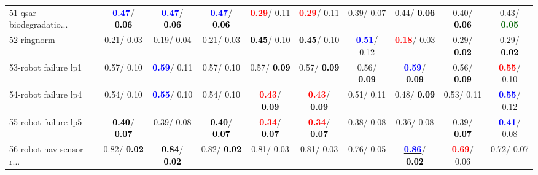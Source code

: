 \begin{table}[h]
\begin{center}
{\begin{tabular}{lc|c|c|c|c|c|c|c|c}
51-qsar biodegradatio... & \textcolor{blue}{\textbf{  0.47}}/\textcolor{black}{\textbf{  0.06}} & \textcolor{blue}{\textbf{  0.47}}/\textcolor{black}{\textbf{  0.06}} & \textcolor{blue}{\textbf{  0.47}}/\textcolor{black}{\textbf{  0.06}} & \textcolor{red}{\textbf{  0.29}}/  0.11 & \textcolor{red}{\textbf{  0.29}}/  0.11 &   0.39/  0.07 &   0.44/\textcolor{black}{\textbf{  0.06}} &   0.40/\textcolor{black}{\textbf{  0.06}} &   0.43/\textcolor{darkgreen}{\textbf{  0.05}} \\
52-ringnorm &   0.21/  0.03 &   0.19/  0.04 &   0.21/  0.03 & \textcolor{black}{\textbf{  0.45}}/  0.10 & \textcolor{black}{\textbf{  0.45}}/  0.10 & \underline{\textcolor{blue}{\textbf{  0.51}}}/  0.12 & \textcolor{red}{\textbf{  0.18}}/  0.03 &   0.29/\textcolor{black}{\textbf{  0.02}} &   0.29/\textcolor{black}{\textbf{  0.02}} \\
53-robot failure lp1 &   0.57/  0.10 & \textcolor{blue}{\textbf{  0.59}}/  0.11 &   0.57/  0.10 &   0.57/\textcolor{black}{\textbf{  0.09}} &   0.57/\textcolor{black}{\textbf{  0.09}} &   0.56/\textcolor{black}{\textbf{  0.09}} & \textcolor{blue}{\textbf{  0.59}}/\textcolor{black}{\textbf{  0.09}} &   0.56/\textcolor{black}{\textbf{  0.09}} & \textcolor{red}{\textbf{  0.55}}/  0.10 \\ \hline
54-robot failure lp4 &   0.54/  0.10 & \textcolor{blue}{\textbf{  0.55}}/  0.10 &   0.54/  0.10 & \textcolor{red}{\textbf{  0.43}}/\textcolor{black}{\textbf{  0.09}} & \textcolor{red}{\textbf{  0.43}}/\textcolor{black}{\textbf{  0.09}} &   0.51/  0.11 &   0.48/\textcolor{black}{\textbf{  0.09}} &   0.53/  0.11 & \textcolor{blue}{\textbf{  0.55}}/  0.12 \\
55-robot failure lp5 & \textcolor{black}{\textbf{  0.40}}/\textcolor{black}{\textbf{  0.07}} &   0.39/  0.08 & \textcolor{black}{\textbf{  0.40}}/\textcolor{black}{\textbf{  0.07}} & \textcolor{red}{\textbf{  0.34}}/\textcolor{black}{\textbf{  0.07}} & \textcolor{red}{\textbf{  0.34}}/\textcolor{black}{\textbf{  0.07}} &   0.38/  0.08 &   0.36/  0.08 &   0.39/\textcolor{black}{\textbf{  0.07}} & \underline{\textcolor{blue}{\textbf{  0.41}}}/  0.08 \\
56-robot nav sensor r... &   0.82/\textcolor{black}{\textbf{  0.02}} & \textcolor{black}{\textbf{  0.84}}/\textcolor{black}{\textbf{  0.02}} &   0.82/\textcolor{black}{\textbf{  0.02}} &   0.81/  0.03 &   0.81/  0.03 &   0.76/  0.05 & \underline{\textcolor{blue}{\textbf{  0.86}}}/\textcolor{black}{\textbf{  0.02}} & \textcolor{red}{\textbf{  0.69}}/  0.06 &   0.72/  0.07 \\

\end{tabular}}
\end{center}
\end{table}
